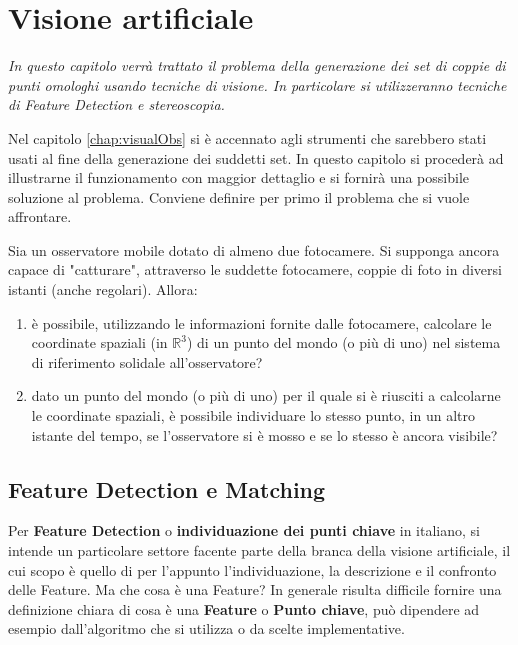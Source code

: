 \chapter{Visione artificiale}
\label{chap:visione}

\begin{minipage}{12cm}\textit{In questo capitolo verrà trattato il problema della generazione dei set di coppie di punti omologhi usando tecniche di visione. In particolare si utilizzeranno tecniche di Feature Detection e stereoscopia.}
\end{minipage}

\vspace*{1cm}

Nel capitolo \ref{chap:visualObs} si è accennato agli strumenti che sarebbero stati usati al fine della generazione dei suddetti set. In questo capitolo si procederà ad illustrarne il funzionamento con maggior dettaglio e si fornirà una possibile soluzione al problema. Conviene definire per primo il problema che si vuole affrontare.

\begin{prob}
	\label{prob:vis:gensets}
	Sia un osservatore mobile dotato di almeno due fotocamere. Si supponga ancora capace di "catturare", attraverso le suddette fotocamere, coppie di foto in diversi istanti (anche regolari). Allora: 
	\begin{enumerate}
		\item è possibile, utilizzando le informazioni fornite dalle fotocamere, calcolare le coordinate spaziali (in $\mathbb{R}^3$) di un punto del mondo (o più di uno) nel sistema di riferimento solidale all'osservatore?
		\item dato un punto del mondo (o più di uno) per il quale si è riusciti a calcolarne le coordinate spaziali, è possibile individuare lo stesso punto, in un altro istante del tempo, se l'osservatore si è mosso e se lo stesso è ancora visibile?  
	\end{enumerate}
\end{prob}

\section{Feature Detection e Matching}
\label{sec:feature}
Per \textbf{Feature Detection} o \textbf{individuazione dei punti chiave} in italiano, si intende un particolare settore facente parte della branca della visione artificiale, il cui scopo è quello di per l'appunto l'individuazione, la descrizione e il confronto delle Feature. Ma che cosa è una Feature?
In generale risulta difficile fornire una definizione chiara di cosa è una \textbf{Feature} o \textbf{Punto chiave}, può dipendere ad esempio dall'algoritmo che si utilizza o da scelte implementative.


